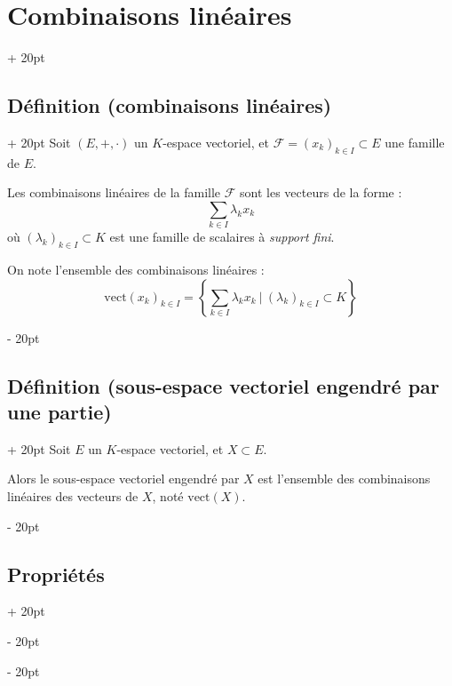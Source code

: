 \documentclass[a4paper, 12pt, twoside]{article}
\newcommand{\set}[1]{\left\{ #1 \right\}}
\newcommand{\ind}[1][20pt]{\advance\leftskip + #1}
\newcommand{\deind}[1][20pt]{\advance\leftskip - #1}
\newenvironment{indt}[2][20pt]{#2 \par \ind[#1]}{\par \deind} %
\begin{document}
    \begin{indt}{\section{Combinaisons linéaires}}
        
        \begin{indt}{\subsection{Définition (combinaisons linéaires)}}
            Soit $(E, +, \cdot)$ un $K$-espace vectoriel, et $\mathcal F = (x_k)_{k \in I} \subset E$ une famille de $E$.
            
            Les combinaisons linéaires de la famille $\mathcal F$ sont les vecteurs de la forme :
                \[ \sum_{k \in I} \lambda_k x_k \]
            où $(\lambda_k)_{k \in I} \subset K$ est une famille de scalaires à \textit{support fini}.
            
            \vspace{6pt}
            
            On note l'ensemble des combinaisons linéaires :
                \[ \mathrm{vect}(x_k)_{k \in I} = \set{\sum_{k \in I} \lambda_k x_k\ |\ (\lambda_k)_{k \in I} \subset K} \]
        \end{indt}
        
        \vspace{12pt}
        
        \begin{indt}{\subsection{Définition (sous-espace vectoriel engendré par une partie)}}
            Soit $E$ un $K$-espace vectoriel, et $X \subset E$.
            
            Alors le sous-espace vectoriel engendré par $X$ est l'ensemble des combinaisons linéaires des vecteurs de $X$, noté $\mathrm{vect}(X)$.
        \end{indt}
        
        \vspace{12pt}
        
        \begin{indt}{\subsection{Propriétés}}
            \label{2.3}
            

\end{indt}
\end{indt}
\end{document}
